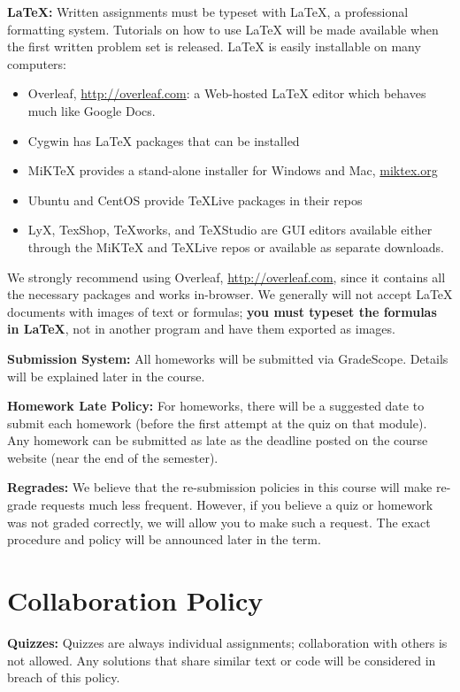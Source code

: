 \documentclass[12pt]{article}
\begin{document}
\textbf{\LaTeX:} Written assignments must be typeset with \LaTeX, a professional formatting system. Tutorials on how to use \LaTeX{} will be made available when the first written problem set is released. \LaTeX{} is easily installable on many computers: 
\begin{itemize}
    \item Overleaf, \url{http://overleaf.com}: a Web-hosted \LaTeX{} editor which behaves much like Google Docs.
    \item Cygwin has \LaTeX{} packages that can be installed
    \item MiKTeX provides a stand-alone installer for Windows and Mac, \url{miktex.org}
    \item Ubuntu and CentOS provide TeXLive packages in their repos
    \item LyX, TexShop, TeXworks, and TeXStudio are GUI editors available either through the MiKTeX and TeXLive repos or available as separate downloads.
\end{itemize}
We strongly recommend using Overleaf, \url{http://overleaf.com}, since it contains all the necessary packages and works in-browser. We generally will not accept \LaTeX{} documents with images of text or formulas; \textbf{you must typeset the formulas in \LaTeX}, not in another program and have them exported as images.

\textbf{Submission System:} All homeworks will be submitted via GradeScope. Details will be explained later in the course. 

\textbf{Homework Late Policy:} For homeworks, there will be a suggested date to submit each homework (before the first attempt at the quiz on that module). Any homework can be submitted as late as the deadline posted on the course website (near the end of the semester).

\textbf{Regrades:} We believe that the re-submission policies in this course will make re-grade requests much less frequent.  However, if you believe a quiz or homework was not graded correctly, we will allow you to make such a request. The exact procedure and policy will be announced later in the term.

\section*{Collaboration Policy}

\textbf{Quizzes:} Quizzes are always individual assignments; collaboration with others is not allowed.  Any solutions that share similar text or code will be considered in breach of this policy.
\end{document}

